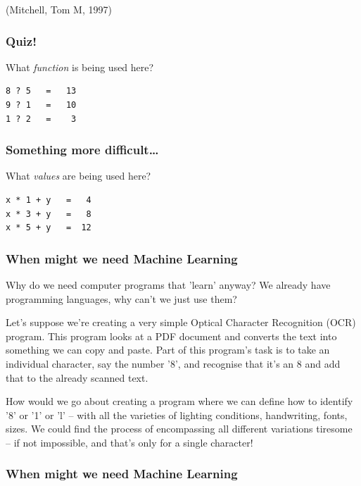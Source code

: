 \documentclass[10pt]{beamer}
\begin{document}
(Mitchell, Tom M, 1997)

\subsubsection*{Quiz!}
\label{sec:org360c08b}

What \emph{function} is being used here?

\begin{verbatim}
8 ? 5   =   13
9 ? 1   =   10
1 ? 2   =    3
\end{verbatim}

\subsubsection*{Something more difficult\ldots{}}
\label{sec:org389a644}

What \emph{values} are being used here?

\begin{verbatim}
x * 1 + y   =   4
x * 3 + y   =   8
x * 5 + y   =  12
\end{verbatim}


\subsubsection*{When might we need Machine Learning}
\label{sec:org9ba4404}

Why do we need computer programs that 'learn' anyway? We already have programming
languages, why can't we just use them?

Let's suppose we're creating a very simple Optical Character Recognition (OCR)
program. This program looks at a PDF document and converts the text into something we
can copy and paste. Part of this program's task is to take an individual character,
say the number '8', and recognise that it's an 8 and add that to the already scanned
text.

How would we go about creating a program where we can define how to identify '8' or
'1' or 'l' -- with all the varieties of lighting conditions, handwriting, fonts,
sizes. We could find the process of encompassing all different variations tiresome --
if not impossible, and that's only for a single character!

\subsubsection*{When might we need Machine Learning}
\label{sec:org5765846}
\end{document}
